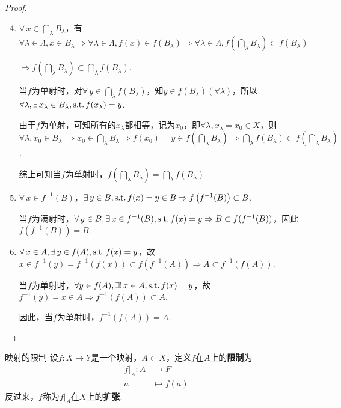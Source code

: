 \begin{proof}
    \begin{enumerate}
        \setcounter{enumi}{3}
        \item $\forall\, x\in \bigcap_{\lambda}{B_\lambda}$，有$\forall \lambda\in\Lambda,x\in B_{\lambda} \Rightarrow \forall \lambda\in\Lambda,f(x)\in f \left(B_\lambda\right) \Rightarrow \forall\lambda\in\Lambda,f\left(\bigcap_{\lambda}{B_\lambda}\right)\subset f(B_\lambda)$\par
        $ \Rightarrow f\left(\bigcap_{\lambda}{B_\lambda}\right)\subset\bigcap_{\lambda}{f(B_\lambda)}$.\par
        当$f$为单射时，对$\forall\, y\in \bigcap_{\lambda}{f(B_\lambda)}$，知$y\in f(B_\lambda)(\forall \lambda)$，所以$\forall \lambda,\exists\, x_\lambda\in B_\lambda,\operatorname{\text{s.t.}} f(x_\lambda)=y$.\par
        由于$f$为单射，可知所有的$x_\lambda$都相等，记为$x_0$，即$\forall \lambda,x_\lambda=x_0 \in X$，则$\forall \lambda,x_0\in B_\lambda\ \Rightarrow x_0\in\bigcap_{\lambda}{B_\lambda} \Rightarrow f(x_0)=y\in f\left(\bigcap_\lambda{B_\lambda}\right) \Rightarrow \bigcap_{\lambda}{f(B_\lambda)}\subset f\left(\bigcap_\lambda{B_\lambda}\right)$.\par
        综上可知当$f$为单射时，$f\left(\bigcap_{\lambda}{B_\lambda}\right) = \bigcap_{\lambda}{f(B_\lambda)}$
        \item $\forall\, x\in f^{-1}(B)$，$\exists\, y\in B,\operatorname{\text{s.t.}} f(x)=y\in B \Rightarrow f\left(f^{-1}(B)\right)\subset B$.\par
        当$f$为满射时，$\forall\, y\in B,\exists\, x\in f^{-1}(B),\operatorname{\text{s.t.}} f(x)=y \Rightarrow B \subset f(f^{-1}(B))$，因此$f\left(f^{-1}(B)\right)= B$.
        \item $\forall\, x\in A,\exists\, y\in f(A),\operatorname{\text{s.t.}} f(x)=y$，故$x\in f^{-1}(y) = f^{-1}(f(x)) \subset f(f^{-1}(A)) \Rightarrow A\subset f^{-1}(f(A))$.\par
        当$f$为单射时，$\forall y\in f(A),\exists!\, x\in A,\operatorname{\text{s.t.}} f(x)=y$，故$f^{-1}(y)=x\in A \Rightarrow f^{-1}(f(A))\subset A$.\par
        因此，当$f$为单射时，$f^{-1}(f(A))=A$.
    \end{enumerate}
\end{proof}


\begin{definition}{映射的限制}
    设$f:X\to Y$是一个映射，$A\subset X$，定义$f$在$A$上的\textbf{限制}为
    \begin{align*}
        f|_A :A &\to F \\
        a &\mapsto f(a)
    \end{align*}
    反过来，$f$称为$f|_A$在$X$上的\textbf{扩张}.
\end{definition}

